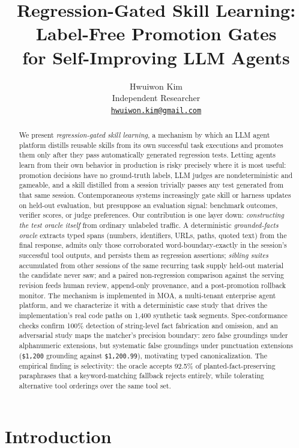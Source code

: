\documentclass{article}
\title{Regression-Gated Skill Learning: Label-Free Promotion Gates\\for Self-Improving LLM Agents}
\author{
    Hwuiwon Kim \\
    Independent Researcher \\
    \href{mailto:hwuiwon.kim@gmail.com}{\texttt{hwuiwon.kim@gmail.com}}
}
\newcommand{\moa}{MOA}
\newcommand{\code}[1]{\texttt{\small #1}}
\begin{document}
\maketitle

\begin{abstract}
We present \emph{regression-gated skill learning}, a mechanism by which an LLM agent platform distills reusable skills from its own successful task executions and promotes them only after they pass automatically generated regression tests. Letting agents learn from their own behavior in production is risky precisely where it is most useful: promotion decisions have no ground-truth labels, LLM judges are nondeterministic and gameable, and a skill distilled from a session trivially passes any test generated from that same session. Contemporaneous systems increasingly gate skill or harness updates on held-out evaluation, but presuppose an evaluation signal: benchmark outcomes, verifier scores, or judge preferences. Our contribution is one layer down: \emph{constructing the test oracle itself} from ordinary unlabeled traffic. A deterministic \emph{grounded-facts oracle} extracts typed spans (numbers, identifiers, URLs, paths, quoted text) from the final response, admits only those corroborated word-boundary-exactly in the session's successful tool outputs, and persists them as regression assertions; \emph{sibling suites} accumulated from other sessions of the same recurring task supply held-out material the candidate never saw; and a paired non-regression comparison against the serving revision feeds human review, append-only provenance, and a post-promotion rollback monitor. The mechanism is implemented in \moa{}, a multi-tenant enterprise agent platform, and we characterize it with a deterministic case study that drives the implementation's real code paths on 1{,}400 synthetic task segments. Spec-conformance checks confirm 100\% detection of string-level fact fabrication and omission, and an adversarial study maps the matcher's precision boundary: zero false groundings under alphanumeric extensions, but systematic false groundings under punctuation extensions (\code{\$1,200} grounding against \code{\$1,200.99}), motivating typed canonicalization. The empirical finding is selectivity: the oracle accepts 92.5\% of planted-fact-preserving paraphrases that a keyword-matching fallback rejects entirely, while tolerating alternative tool orderings over the same tool set.
\end{abstract}

\section{Introduction}
\label{sec:intro}
\end{document}
